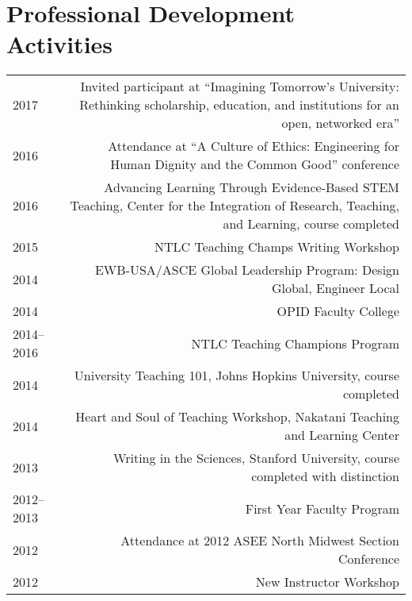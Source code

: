 \section*{Professional Development Activities}
\begin{tabular}{L!{\VRule}R}
2017&Invited participant at ``Imagining Tomorrow's University: Rethinking scholarship, education, and institutions for an open, networked era''\\
2016&Attendance at ``A Culture of Ethics: Engineering for Human Dignity and the Common Good'' conference\\
2016&Advancing Learning Through Evidence-Based STEM Teaching, Center for the Integration of Research, Teaching, and Learning, course completed\\
2015&NTLC Teaching Champs Writing Workshop\\
2014&EWB-USA/ASCE Global Leadership Program: Design Global, Engineer Local\\
2014&OPID Faculty College\\
2014--2016&NTLC Teaching Champions Program\\
2014&University Teaching 101, Johns Hopkins University, course completed\\
2014&Heart and Soul of Teaching Workshop, Nakatani Teaching and Learning Center\\
2013&Writing in the Sciences, Stanford University, course completed with distinction\\
2012--2013&First Year Faculty Program\\
2012&Attendance at 2012 ASEE North Midwest Section Conference\\
2012&New Instructor Workshop\\
\end{tabular}